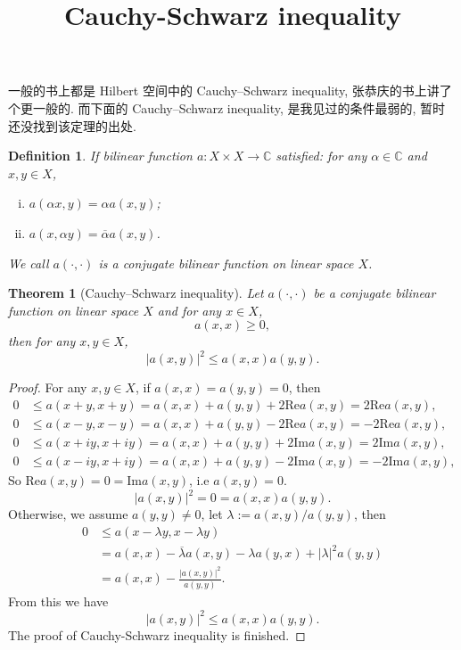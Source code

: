 \documentclass[a4paper,12pt]{article}
\title{Cauchy-Schwarz inequality}
\author{}
\newtheorem{theorem}{Theorem}
\newtheorem{definition}{Definition}
\begin{document}
\maketitle

一般的书上都是 Hilbert 空间中的 Cauchy–Schwarz inequality, 张恭庆的书上讲了个更一般的. 
而下面的 Cauchy–Schwarz inequality, 是我见过的条件最弱的, 暂时还没找到该定理的出处.

\begin{definition}
    If bilinear function $ a: X \times X \to \mathbb{C} $ satisfied: 
    for any $ \alpha \in \mathbb{C} $ and $ x, y \in X $,
    \begin{enumerate}[(i)]
        \item $ a(\alpha x, y) = \alpha a(x, y) $;
        \item $ a(x, \alpha y) = \overline{\alpha} a(x, y) $.
    \end{enumerate}
    We call $ a(\cdot, \cdot) $ is a conjugate bilinear function on linear space $ X $.
\end{definition}

\begin{theorem}[Cauchy–Schwarz inequality]
    Let $ a(\cdot, \cdot) $ be a conjugate bilinear function on linear space $ X $ and for any $ x \in X $,
    $$ 
        a(x, x) \geq 0,
    $$
    then for any $  x, y \in X $,
    \begin{equation} \label{result}
        |a(x, y)|^2 \leq a(x, x) a(y, y).
    \end{equation}
\end{theorem}

\begin{proof}
    For any $  x, y \in X $, if $ a(x, x) = a(y, y) = 0 $, then
    \begin{align*}
        0 &\leq a(x + y, x + y) = a(x, x) + a(y, y) + 2 \text{Re} a(x, y) = 2 \text{Re} a(x, y), \\
        0 &\leq a(x - y, x - y) = a(x, x) + a(y, y) - 2 \text{Re} a(x, y) = - 2 \text{Re} a(x, y), \\
        0 &\leq a(x + iy, x + iy) = a(x, x) + a(y, y) + 2 \text{Im} a(x, y) = 2 \text{Im} a(x, y), \\
        0 &\leq a(x - iy, x + iy) = a(x, x) + a(y, y) - 2 \text{Im} a(x, y) = - 2 \text{Im} a(x, y),
    \end{align*}
    So $ \text{Re} a(x, y) = 0 = \text{Im} a(x, y) $, i.e $ a(x, y) = 0 $. 
    $$ 
        |a(x, y)|^2 = 0 = a(x, x) a(y, y).
    $$
    Otherwise, we assume $ a(y, y) \neq 0 $, let $ \lambda := a(x, y) / a(y, y) $, then
    \begin{align*}
        0 &\leq a(x - \lambda y, x - \lambda y)\\
          &= a(x, x) - \overline{\lambda} a(x, y) - \lambda a(y, x) + |\lambda|^2 a(y, y) \\
          &= a(x, x) - \frac{|a(x, y)|^2}{a(y, y)}.
    \end{align*}
    From this we have
    $$ 
        |a(x, y)|^2 \leq a(x, x) a(y, y).
    $$
    The proof of Cauchy-Schwarz inequality is finished.
\end{proof}
\end{document}
